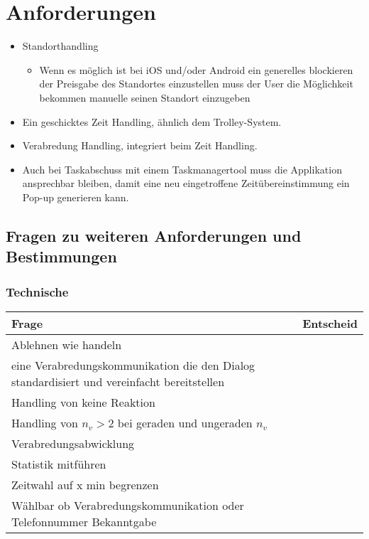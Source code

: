 
\chapter{Anforderungen}

\begin{itemize}
\item Standorthandling
\begin{itemize}
\item Wenn es möglich ist bei iOS und/oder Android ein generelles blockieren der Preisgabe des Standortes einzustellen muss der User die Möglichkeit bekommen manuelle seinen Standort einzugeben
\end{itemize}
\item Ein geschicktes Zeit Handling, ähnlich dem Trolley-System.
\item Verabredung Handling, integriert beim Zeit Handling.
\item Auch bei Taskabschuss mit einem Taskmanagertool muss die Applikation ansprechbar bleiben, damit eine neu eingetroffene Zeitübereinstimmung ein Pop-up generieren kann.
\end{itemize}




\section{Fragen zu weiteren Anforderungen und Bestimmungen}

\subsection{Technische}
\begin{tabularx}{\textwidth}{X|X}
Frage & Entscheid \\\hline
Ablehnen wie handeln & \\\hline
eine Verabredungskommunikation die den Dialog standardisiert und vereinfacht bereitstellen & \\\hline
Handling von keine Reaktion & \\\hline
Handling von $n_v>2$ bei geraden und ungeraden $n_v$ & \\\hline
Verabredungsabwicklung & \\\hline
Statistik mitführen & \\\hline
Zeitwahl auf x min begrenzen & \\\hline
Wählbar ob Verabredungskommunikation oder Telefonnummer Bekanntgabe & \\
\end{tabularx}


